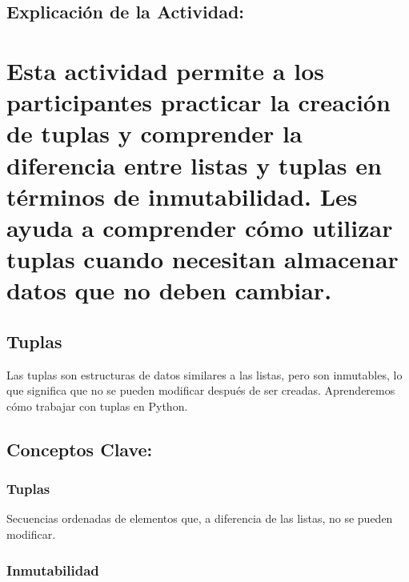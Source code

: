 \documentclass[
  a4paper,
  onepage,
  openany]{scrreprt}
\begin{document}
\hypertarget{explicaciuxf3n-de-la-actividad-18}{%
\section{Explicación de la
Actividad:}\label{explicaciuxf3n-de-la-actividad-18}}

\hypertarget{esta-actividad-permite-a-los-participantes-practicar-la-creaciuxf3n-de-tuplas-y-comprender-la-diferencia-entre-listas-y-tuplas-en-tuxe9rminos-de-inmutabilidad.-les-ayuda-a-comprender-cuxf3mo-utilizar-tuplas-cuando-necesitan-almacenar-datos-que-no-deben-cambiar.}{%
\chapter{Esta actividad permite a los participantes practicar la
creación de tuplas y comprender la diferencia entre listas y tuplas en
términos de inmutabilidad. Les ayuda a comprender cómo utilizar tuplas
cuando necesitan almacenar datos que no deben
cambiar.}\label{esta-actividad-permite-a-los-participantes-practicar-la-creaciuxf3n-de-tuplas-y-comprender-la-diferencia-entre-listas-y-tuplas-en-tuxe9rminos-de-inmutabilidad.-les-ayuda-a-comprender-cuxf3mo-utilizar-tuplas-cuando-necesitan-almacenar-datos-que-no-deben-cambiar.}}

\hypertarget{tuplas-2}{%
\section{Tuplas}\label{tuplas-2}}

Las tuplas son estructuras de datos similares a las listas, pero son
inmutables, lo que significa que no se pueden modificar después de ser
creadas. Aprenderemos cómo trabajar con tuplas en Python.

\hypertarget{conceptos-clave-21}{%
\section{Conceptos Clave:}\label{conceptos-clave-21}}

\hypertarget{tuplas-3}{%
\subsection{Tuplas}\label{tuplas-3}}

Secuencias ordenadas de elementos que, a diferencia de las listas, no se
pueden modificar.

\hypertarget{inmutabilidad-1}{%
\subsection{Inmutabilidad}\label{inmutabilidad-1}}
\end{document}
